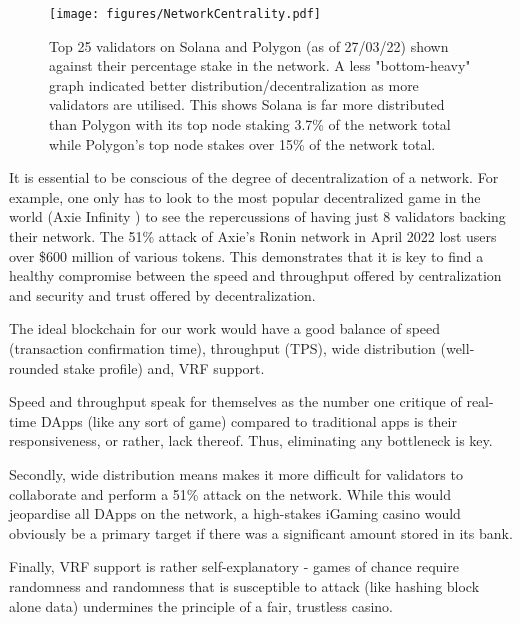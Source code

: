 \documentclass[10pt,journal,compsoc]{IEEEtran}
\begin{document}
\begin{figure}[!h]
    \centering
    \texttt{[image: figures/NetworkCentrality.pdf]}
    \caption{Top 25 validators on Solana and Polygon \cite{solana_validators_www.validators.app} \cite{polygon_web_wallet_v2} (as of 27/03/22) shown against their percentage stake in the network. A less "bottom-heavy" graph indicated better distribution/decentralization as more validators are utilised. This shows Solana is far more distributed than Polygon with its top node staking 3.7\% of the network total while Polygon's top node stakes over 15\% of the network total.}
    \label{fig:networkcent}
\end{figure}

It is essential to be conscious of the degree of decentralization of a network. For example, one only has to look to the most popular decentralized game in the world (Axie Infinity \cite{whitepaper_axie_infinity}) to see the repercussions of having just 8 validators backing their network. The 51\% attack of Axie's Ronin network in April 2022 \cite{community_alert:_ronin_validators_compromised} lost users over \$600 million of various tokens. This demonstrates that it is key to find a healthy compromise between the speed and throughput offered by centralization and security and trust offered by decentralization.

The ideal blockchain for our work would have a good balance of speed (transaction confirmation time), throughput (TPS), wide distribution (well-rounded stake profile) and, VRF support. 

Speed and throughput speak for themselves as the number one critique of real-time DApps (like any sort of game) compared to traditional apps is their responsiveness, or rather, lack thereof. Thus, eliminating any bottleneck is key. 

Secondly, wide distribution means makes it more difficult for validators to collaborate and perform a 51\% attack on the network. While this would jeopardise all DApps on the network, a high-stakes iGaming casino would obviously be a primary target if there was a significant amount stored in its bank.

Finally, VRF support is rather self-explanatory - games of chance require randomness and randomness that is susceptible to attack (like hashing block alone data) undermines the principle of a fair, trustless casino.
\end{document}

